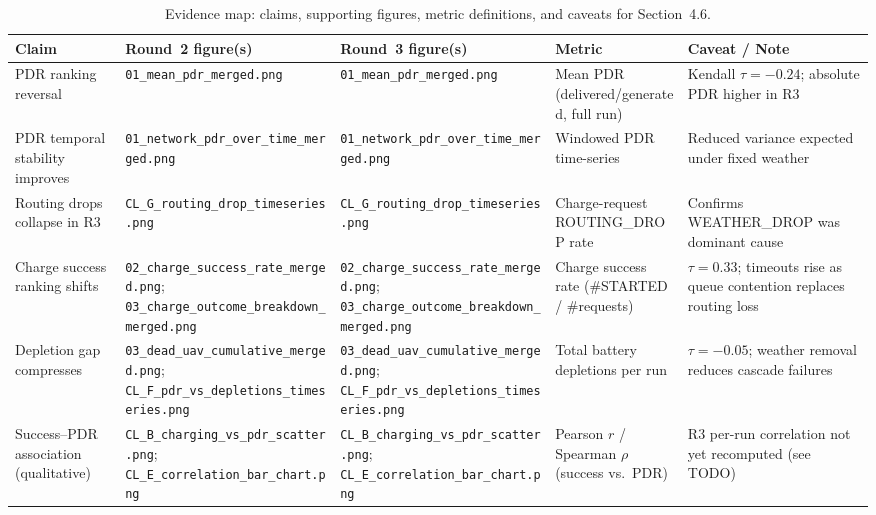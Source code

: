 \begin{table}[htbp]
\centering
\caption{Evidence map: claims, supporting figures, metric definitions,
and caveats for Section~4.6.}
\label{tab:evidence-map}
\footnotesize
\begin{tabular}{p{3.2cm} p{2.8cm} p{2.8cm} p{2.5cm} p{2.7cm}}
\hline
\textbf{Claim} & \textbf{Round~2 figure(s)} & \textbf{Round~3 figure(s)} & \textbf{Metric} & \textbf{Caveat / Note} \\
\hline

PDR ranking reversal
& \texttt{01\_mean\_pdr\_merged.png}
& \texttt{01\_mean\_pdr\_merged.png}
& Mean PDR (delivered/generated, full run)
& Kendall $\tau = -0.24$; absolute PDR higher in R3 \\

PDR temporal stability improves
& \texttt{01\_network\_pdr\_over\_time\_merged.png}
& \texttt{01\_network\_pdr\_over\_time\_merged.png}
& Windowed PDR time-series
& Reduced variance expected under fixed weather \\

Routing drops collapse in R3
& \texttt{CL\_G\_routing\_drop\_timeseries.png}
& \texttt{CL\_G\_routing\_drop\_timeseries.png}
& Charge-request ROUTING\_DROP rate
& Confirms WEATHER\_DROP was dominant cause \\

Charge success ranking shifts
& \texttt{02\_charge\_success\_rate\_merged.png}; \texttt{03\_charge\_outcome\_breakdown\_merged.png}
& \texttt{02\_charge\_success\_rate\_merged.png}; \texttt{03\_charge\_outcome\_breakdown\_merged.png}
& Charge success rate (\#STARTED / \#requests)
& $\tau = 0.33$; timeouts rise as queue contention replaces routing loss \\

Depletion gap compresses
& \texttt{03\_dead\_uav\_cumulative\_merged.png}; \texttt{CL\_F\_pdr\_vs\_depletions\_timeseries.png}
& \texttt{03\_dead\_uav\_cumulative\_merged.png}; \texttt{CL\_F\_pdr\_vs\_depletions\_timeseries.png}
& Total battery depletions per run
& $\tau = -0.05$; weather removal reduces cascade failures \\

Success--PDR association (qualitative)
& \texttt{CL\_B\_charging\_vs\_pdr\_scatter.png}; \texttt{CL\_E\_correlation\_bar\_chart.png}
& \texttt{CL\_B\_charging\_vs\_pdr\_scatter.png}; \texttt{CL\_E\_correlation\_bar\_chart.png}
& Pearson $r$ / Spearman $\rho$ (success vs.\ PDR)
& R3 per-run correlation not yet recomputed (see TODO) \\


\end{tabular}
\end{table}
